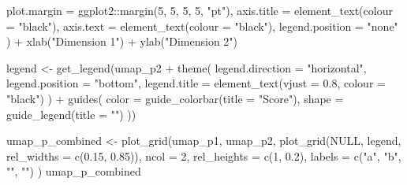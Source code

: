 \documentclass[
  11pt,
  oneside]{book}
\newenvironment{Shaded}{\begin{snugshade}}{\end{snugshade}}
\newcommand{\AttributeTok}[1]{\textcolor[rgb]{0.77,0.63,0.00}{#1}}
\newcommand{\ConstantTok}[1]{\textcolor[rgb]{0.00,0.00,0.00}{#1}}
\newcommand{\DecValTok}[1]{\textcolor[rgb]{0.00,0.00,0.81}{#1}}
\newcommand{\FloatTok}[1]{\textcolor[rgb]{0.00,0.00,0.81}{#1}}
\newcommand{\FunctionTok}[1]{\textcolor[rgb]{0.00,0.00,0.00}{#1}}
\newcommand{\NormalTok}[1]{#1}
\newcommand{\OtherTok}[1]{\textcolor[rgb]{0.56,0.35,0.01}{#1}}
\newcommand{\SpecialCharTok}[1]{\textcolor[rgb]{0.00,0.00,0.00}{#1}}
\newcommand{\StringTok}[1]{\textcolor[rgb]{0.31,0.60,0.02}{#1}}
\begin{document}
\begin{Shaded}
\begin{Highlighting}[]
    \AttributeTok{plot.margin =}\NormalTok{ ggplot2}\SpecialCharTok{::}\FunctionTok{margin}\NormalTok{(}\DecValTok{5}\NormalTok{, }\DecValTok{5}\NormalTok{, }\DecValTok{5}\NormalTok{, }\DecValTok{5}\NormalTok{, }\StringTok{"pt"}\NormalTok{),}
    \AttributeTok{axis.title =} \FunctionTok{element\_text}\NormalTok{(}\AttributeTok{colour =} \StringTok{"black"}\NormalTok{),}
    \AttributeTok{axis.text =} \FunctionTok{element\_text}\NormalTok{(}\AttributeTok{colour =} \StringTok{"black"}\NormalTok{),}
    \AttributeTok{legend.position =} \StringTok{"none"}
\NormalTok{  ) }\SpecialCharTok{+}
  \FunctionTok{xlab}\NormalTok{(}\StringTok{"Dimension 1"}\NormalTok{) }\SpecialCharTok{+}
  \FunctionTok{ylab}\NormalTok{(}\StringTok{"Dimension 2"}\NormalTok{)}

\NormalTok{legend }\OtherTok{\textless{}{-}} \FunctionTok{get\_legend}\NormalTok{(umap\_p2 }\SpecialCharTok{+}
  \FunctionTok{theme}\NormalTok{(}
    \AttributeTok{legend.direction =} \StringTok{"horizontal"}\NormalTok{,}
    \AttributeTok{legend.position =} \StringTok{"bottom"}\NormalTok{,}
    \AttributeTok{legend.title =} \FunctionTok{element\_text}\NormalTok{(}\AttributeTok{vjust =} \FloatTok{0.8}\NormalTok{, }\AttributeTok{colour =} \StringTok{"black"}\NormalTok{)}
\NormalTok{  ) }\SpecialCharTok{+}
  \FunctionTok{guides}\NormalTok{(}
    \AttributeTok{color =} \FunctionTok{guide\_colorbar}\NormalTok{(}\AttributeTok{title =} \StringTok{"Score"}\NormalTok{),}
    \AttributeTok{shape =} \FunctionTok{guide\_legend}\NormalTok{(}\AttributeTok{title =} \StringTok{""}\NormalTok{)}
\NormalTok{  ))}
\end{Highlighting}
\end{Shaded}

\begin{Shaded}
\begin{Highlighting}[]
\NormalTok{umap\_p\_combined }\OtherTok{\textless{}{-}} \FunctionTok{plot\_grid}\NormalTok{(umap\_p1, umap\_p2,}
  \FunctionTok{plot\_grid}\NormalTok{(}\ConstantTok{NULL}\NormalTok{, legend, }\AttributeTok{rel\_widths =} \FunctionTok{c}\NormalTok{(}\FloatTok{0.15}\NormalTok{, }\FloatTok{0.85}\NormalTok{)),}
  \AttributeTok{ncol =} \DecValTok{2}\NormalTok{,}
  \AttributeTok{rel\_heights =} \FunctionTok{c}\NormalTok{(}\DecValTok{1}\NormalTok{, }\FloatTok{0.2}\NormalTok{), }\AttributeTok{labels =} \FunctionTok{c}\NormalTok{(}\StringTok{"a"}\NormalTok{, }\StringTok{"b"}\NormalTok{, }\StringTok{""}\NormalTok{, }\StringTok{""}\NormalTok{)}
\NormalTok{)}
\NormalTok{umap\_p\_combined}
\end{Highlighting}
\end{Shaded}
\end{document}
